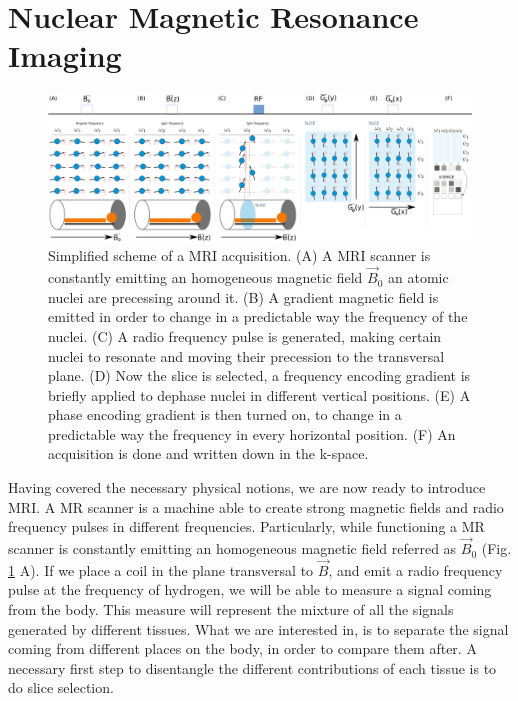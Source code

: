 \section{Nuclear Magnetic Resonance Imaging}

\begin{figure}[t]
    \includegraphics[width=\textwidth]{3.mri/img/mri.png}
    \caption{Simplified scheme of a MRI acquisition. (A) A MRI scanner is constantly
             emitting an homogeneous magnetic field $\vec B_0$ an atomic nuclei
             are precessing around it. (B) A gradient magnetic field is emitted
             in order to change in a predictable way the frequency of the nuclei.
             (C) A radio frequency pulse is generated, making certain nuclei to
             resonate and moving their precession to the transversal plane.
             (D) Now the slice is selected, a frequency encoding gradient is
             briefly applied to dephase nuclei in different vertical positions.
             (E) A phase encoding gradient is then turned on, to change in a predictable
             way the frequency in every horizontal position. (F) An acquisition
             is done and written down in the k-space.}
     \label{fig:mri}
\end{figure}

Having covered the necessary physical notions, we are now ready to introduce
MRI. A MR scanner is a machine able to create strong magnetic fields and radio
frequency pulses in different frequencies. Particularly, while functioning
a MR scanner is constantly emitting an homogeneous magnetic field referred as $\vec B_0$
(Fig. \ref{fig:mri} A). If we place a coil in the plane transversal to $\vec B$,
and emit a radio frequency pulse at the frequency of hydrogen, we will be
able to measure a signal coming from the body. This measure will represent the
mixture of all the signals generated by different tissues. What we are interested
in, is to separate the signal coming from different places on the body, in order
to compare them after. A necessary first step to disentangle the different
contributions of each tissue is to do slice selection. 

